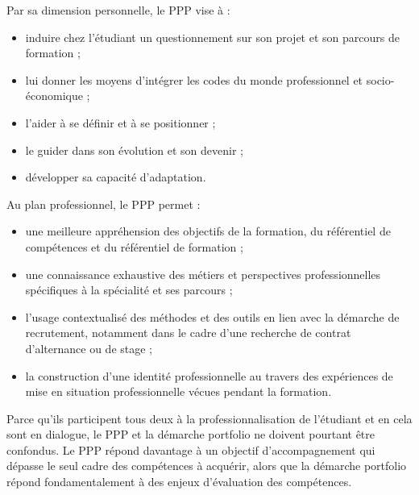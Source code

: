 {Par sa dimension personnelle, le PPP vise à :
\begin{itemize}
\item induire chez l'étudiant un questionnement sur son projet et son parcours de formation ;
\item lui donner les moyens d'intégrer les codes du monde professionnel et socio-économique ; 
\item l'aider à se définir et à se positionner ;
\item le guider dans son évolution et son devenir ;
\item développer sa capacité d'adaptation.
\end{itemize}

Au plan professionnel, le PPP permet :
\begin{itemize}
\item une meilleure appréhension des objectifs de la formation, du référentiel de compétences et du référentiel de formation ;
\item une connaissance exhaustive des métiers et perspectives professionnelles spécifiques à la spécialité et ses parcours ;
\item l'usage contextualisé des méthodes et des outils en lien avec la démarche de recrutement, notamment dans le cadre d'une recherche de contrat d'alternance ou de stage ;
\item la construction d'une identité professionnelle au travers des expériences de mise en situation professionnelle vécues pendant la formation.
\end{itemize}

Parce qu'ils participent tous deux à la professionnalisation de l'étudiant et en cela sont en dialogue, le PPP et la démarche portfolio ne doivent pourtant être confondus. Le PPP répond davantage à un objectif d'accompagnement qui dépasse le seul cadre des compétences à acquérir, alors que la démarche portfolio répond fondamentalement à des enjeux d'évaluation des compétences.

}
